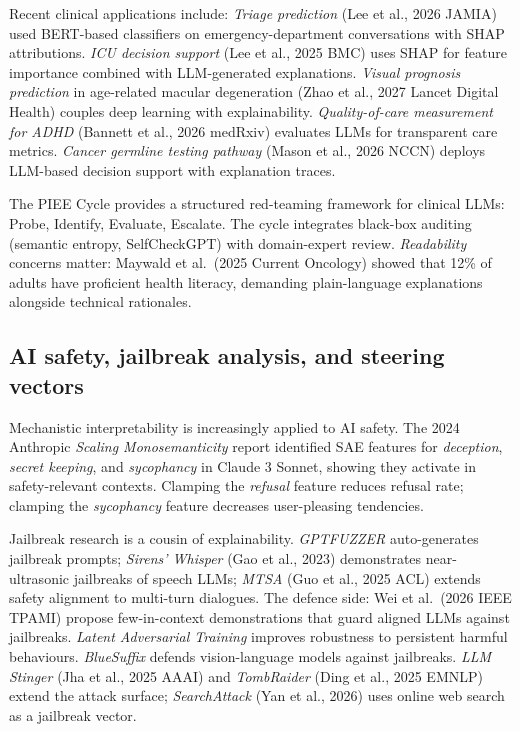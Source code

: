 \documentclass{article}
\begin{document}
Recent clinical applications include: \emph{Triage prediction} (Lee et al., 2026 JAMIA) used BERT-based classifiers on emergency-department conversations with SHAP attributions. \emph{ICU decision support} (Lee et al., 2025 BMC) uses SHAP for feature importance combined with LLM-generated explanations. \emph{Visual prognosis prediction} in age-related macular degeneration (Zhao et al., 2027 Lancet Digital Health) couples deep learning with explainability. \emph{Quality-of-care measurement for ADHD} (Bannett et al., 2026 medRxiv) evaluates LLMs for transparent care metrics. \emph{Cancer germline testing pathway} (Mason et al., 2026 NCCN) deploys LLM-based decision support with explanation traces.

The PIEE Cycle \citep{trabilsy2025thepieecycleastruc} provides a structured red-teaming framework for clinical LLMs: Probe, Identify, Evaluate, Escalate. The cycle integrates black-box auditing (semantic entropy, SelfCheckGPT) with domain-expert review. \emph{Readability} concerns matter: Maywald et al.~(2025 Current Oncology) showed that 12\% of adults have proficient health literacy, demanding plain-language explanations alongside technical rationales.

\subsection{AI safety, jailbreak analysis, and steering vectors}\label{ai-safety-jailbreak-analysis-and-steering-vectors}

Mechanistic interpretability is increasingly applied to AI safety. The 2024 Anthropic \emph{Scaling Monosemanticity} report identified SAE features for \emph{deception}, \emph{secret keeping}, and \emph{sycophancy} in Claude 3 Sonnet, showing they activate in safety-relevant contexts. Clamping the \emph{refusal} feature reduces refusal rate; clamping the \emph{sycophancy} feature decreases user-pleasing tendencies.

Jailbreak research is a cousin of explainability. \emph{GPTFUZZER} \citep{yu2023gptfuzzerredteamin} auto-generates jailbreak prompts; \emph{Sirens' Whisper} (Gao et al., 2023) demonstrates near-ultrasonic jailbreaks of speech LLMs; \emph{MTSA} (Guo et al., 2025 ACL) extends safety alignment to multi-turn dialogues. The defence side: Wei et al.~(2026 IEEE TPAMI) propose few-in-context demonstrations that guard aligned LLMs against jailbreaks. \emph{Latent Adversarial Training} \citep{sheshadri2024latentadversarialt} improves robustness to persistent harmful behaviours. \emph{BlueSuffix} \citep{zhao2024explainabilityforl} defends vision-language models against jailbreaks. \emph{LLM Stinger} (Jha et al., 2025 AAAI) and \emph{TombRaider} (Ding et al., 2025 EMNLP) extend the attack surface; \emph{SearchAttack} (Yan et al., 2026) uses online web search as a jailbreak vector.
\end{document}
